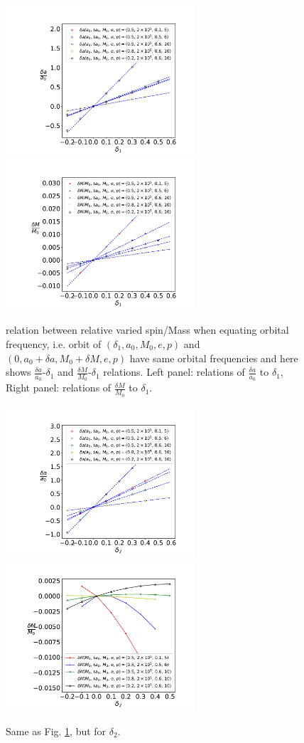 \documentclass{article}
\begin{document}
\begin{figure}[!ht]
	\centering
	\includegraphics[width=7cm]{d1_spin_linear.pdf}
	\includegraphics[width=7cm]{d1_M_linear.pdf}
	\caption{relation between relative varied spin/Mass when equating orbital frequency, i.e. orbit of $(\delta_1, a_0, M_0,e,p)$ and $(0,a_0+\delta a, M_0+\delta M,e,p)$ have same orbital frequencies and here shows $\frac{\delta a}{a_0}$-$\delta_1$ and $\frac{\delta M}{M_0}$-$\delta_1$ relations. Left panel: relations of $\frac{\delta a}{a_0}$ to $\delta_1$, Right panel: relations of $\frac{\delta M}{M_0}$ to $\delta_1$.}
	\label{da_linear}
\end{figure}

\begin{figure}[!ht]
	\centering
	\includegraphics[width=7cm]{d2_spin_linear.pdf}
	\includegraphics[width=7cm]{d2_M_linear.pdf}
	\caption{Same as Fig. \ref{da_linear}, but for $\delta_2$.}
	\label{d2_linear}
\end{figure}
\end{document}
